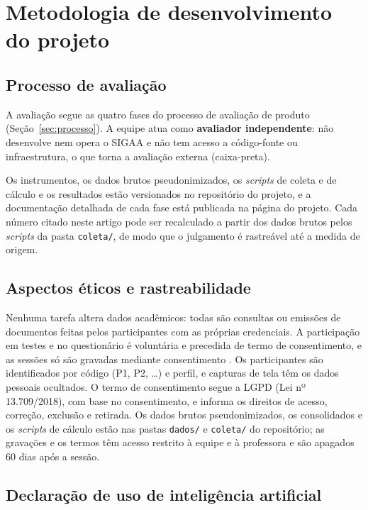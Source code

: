 \section{Metodologia de desenvolvimento do projeto}
\label{sec:metodologia}

\subsection{Processo de avaliação}

A avaliação segue as quatro fases do processo de avaliação de produto (Seção~\ref{sec:processo}). A equipe atua como \textbf{avaliador independente}: não desenvolve nem opera o SIGAA e não tem acesso a código-fonte ou infraestrutura, o que torna a avaliação externa (caixa-preta).

Os instrumentos, os dados brutos pseudonimizados, os \textit{scripts} de coleta e de cálculo e os resultados estão versionados no repositório do projeto, e a documentação detalhada de cada fase está publicada na página do projeto. Cada número citado neste artigo pode ser recalculado a partir dos dados brutos pelos \textit{scripts} da pasta \texttt{coleta/}, de modo que o julgamento é rastreável até a medida de origem.

\subsection{Aspectos éticos e rastreabilidade}

Nenhuma tarefa altera dados acadêmicos: todas são consultas ou emissões de documentos feitas pelos participantes com as próprias credenciais. A participação em testes e no questionário é voluntária e precedida de termo de consentimento, e as sessões só são gravadas mediante consentimento \cite{ramos2026roteiro}. Os participantes são identificados por código (P1, P2, \ldots) e perfil, e capturas de tela têm os dados pessoais ocultados. O termo de consentimento segue a LGPD (Lei nº 13.709/2018), com base no consentimento, e informa os direitos de acesso, correção, exclusão e retirada. Os dados brutos pseudonimizados, os consolidados e os \textit{scripts} de cálculo estão nas pastas \texttt{dados/} e \texttt{coleta/} do repositório; as gravações e os termos têm acesso restrito à equipe e à professora e são apagados 60 dias após a sessão.

\subsection{Declaração de uso de inteligência artificial}

